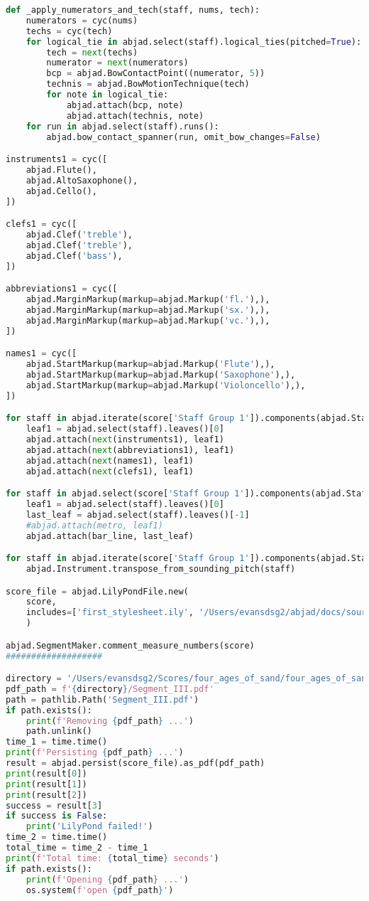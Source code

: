 \begin{lstlisting}[language=Python, caption=Four Ages of Sand Segment\_III]
def _apply_numerators_and_tech(staff, nums, tech):
    numerators = cyc(nums)
    techs = cyc(tech)
    for logical_tie in abjad.select(staff).logical_ties(pitched=True):
        tech = next(techs)
        numerator = next(numerators)
        bcp = abjad.BowContactPoint((numerator, 5))
        technis = abjad.BowMotionTechnique(tech)
        for note in logical_tie:
            abjad.attach(bcp, note)
            abjad.attach(technis, note)
    for run in abjad.select(staff).runs():
        abjad.bow_contact_spanner(run, omit_bow_changes=False)

instruments1 = cyc([
    abjad.Flute(),
    abjad.AltoSaxophone(),
    abjad.Cello(),
])

clefs1 = cyc([
    abjad.Clef('treble'),
    abjad.Clef('treble'),
    abjad.Clef('bass'),
])

abbreviations1 = cyc([
    abjad.MarginMarkup(markup=abjad.Markup('fl.'),),
    abjad.MarginMarkup(markup=abjad.Markup('sx.'),),
    abjad.MarginMarkup(markup=abjad.Markup('vc.'),),
])

names1 = cyc([
    abjad.StartMarkup(markup=abjad.Markup('Flute'),),
    abjad.StartMarkup(markup=abjad.Markup('Saxophone'),),
    abjad.StartMarkup(markup=abjad.Markup('Violoncello'),),
])

for staff in abjad.iterate(score['Staff Group 1']).components(abjad.Staff):
    leaf1 = abjad.select(staff).leaves()[0]
    abjad.attach(next(instruments1), leaf1)
    abjad.attach(next(abbreviations1), leaf1)
    abjad.attach(next(names1), leaf1)
    abjad.attach(next(clefs1), leaf1)

for staff in abjad.select(score['Staff Group 1']).components(abjad.Staff)[0]:
    leaf1 = abjad.select(staff).leaves()[0]
    last_leaf = abjad.select(staff).leaves()[-1]
    #abjad.attach(metro, leaf1)
    abjad.attach(bar_line, last_leaf)

for staff in abjad.iterate(score['Staff Group 1']).components(abjad.Staff):
    abjad.Instrument.transpose_from_sounding_pitch(staff)

score_file = abjad.LilyPondFile.new(
    score,
    includes=['first_stylesheet.ily', '/Users/evansdsg2/abjad/docs/source/_stylesheets/abjad.ily'],
    )

abjad.SegmentMaker.comment_measure_numbers(score)
###################

directory = '/Users/evansdsg2/Scores/four_ages_of_sand/four_ages_of_sand/Segments/Segment_III'
pdf_path = f'{directory}/Segment_III.pdf'
path = pathlib.Path('Segment_III.pdf')
if path.exists():
    print(f'Removing {pdf_path} ...')
    path.unlink()
time_1 = time.time()
print(f'Persisting {pdf_path} ...')
result = abjad.persist(score_file).as_pdf(pdf_path)
print(result[0])
print(result[1])
print(result[2])
success = result[3]
if success is False:
    print('LilyPond failed!')
time_2 = time.time()
total_time = time_2 - time_1
print(f'Total time: {total_time} seconds')
if path.exists():
    print(f'Opening {pdf_path} ...')
    os.system(f'open {pdf_path}')
\end{lstlisting}
\doublespace

